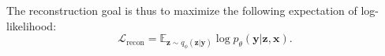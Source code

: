 \documentclass[11pt]{article}
\begin{document}
The reconstruction goal is thus to maximize the following expectation of log-likelihood:
\begin{equation}
    \mathcal{L}_{\text{recon}} = \mathbb{E}_{\boldsymbol{z}\sim q_\phi(\boldsymbol{z}|\boldsymbol{y})}\log p_\theta(\boldsymbol{y}|\boldsymbol{z}, \boldsymbol{x}).
\end{equation}

\end{document}

